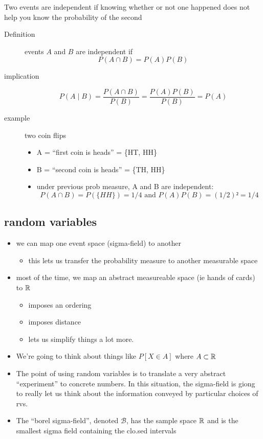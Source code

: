       Two events are independent if knowing whether or not one
      happened does not help you know the probability of the second
\begin{description}
\item[Definition] events $A$ and $B$ are independent if \[P(A ∩
                      B) = P(A) P(B)\]
\item[implication] \[P(A ∣ B) = \frac{P(A ∩ B)}{P(B)} =
                       \frac{P(A) P(B)}{P(B)} = P(A)\]
\item[example] two coin flips
\begin{itemize}
\item A = ``first coin is heads'' = \{HT, HH\}
\item B = ``second coin is heads'' = \{TH, HH\}
\item under previous prob measure, A and B are independent: \[P(A
          ∩ B) = P(\{HH\}) = 1/4 \text{ and } P(A)P(B) = (1/2)² = 1/4\]
\end{itemize}
\end{description}

\subsection{random variables}

\begin{itemize}
\item we can map one event space (sigma-field) to another
\begin{itemize}
\item this lets us transfer the probability measure to another
        measurable space
\end{itemize}
\item most of the time, we map an abstract measureable space (ie hands
      of cards) to $\mathbb{R}$
\begin{itemize}
\item imposes an ordering
\item imposes distance
\item lets us simplify things a lot more.
\end{itemize}
\item We're going to think about things like $P[X ∈ A]$ where $A
      \subset \mathbb{R}$
\item The point of using random variables is to translate a very
      abstract ``experiment'' to concrete numbers.  In this situation,
      the sigma-field is giong to really let us think about the
      information conveyed by particular choices of rvs.
\item The ``borel sigma-field'', denoted $\mathcal B$, has the sample
      space $\mathbb{R}$ and is the smallest sigma field containing the
      clo.sed intervals
\end{itemize}


